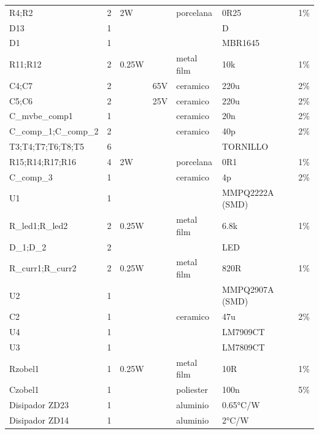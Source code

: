 \documentclass[a4paper,12pt,twoside]{article}
\begin{document}
\begin{table}[h!]
\begin{tabular}{@{}lllllll@{}}
R4;R2                 & 2        &  2W       &           &  porcelana & 0R25     & 1\% \\
D13                   & 1        &           &           &            & D        &     \\
D1                    & 1        &           &           &            & MBR1645  &     \\
R11;R12               & 2        &  0.25W    &           &  metal film& 10k      & 1\% \\
C4;C7                 & 2        &           & 65V       &  ceramico  & 220u     & 2\% \\
C5;C6                 & 2        &           & 25V       &  ceramico  & 220u     & 2\% \\
C\_mvbe\_comp1        & 1        &           &           &  ceramico  & 20n      & 2\% \\
C\_comp\_1;C\_comp\_2 & 2        &           &           &  ceramico  & 40p      & 2\% \\
T3;T4;T7;T6;T8;T5     & 6        &           &           &            & TORNILLO &     \\
R15;R14;R17;R16       & 4        &  2W       &           &  porcelana & 0R1      & 1\% \\
C\_comp\_3            & 1        &           &           &  ceramico  & 4p       & 2\% \\
U1                    & 1        &           &           &            & MMPQ2222A (SMD)& \\
R\_led1;R\_led2       & 2        &  0.25W    &           &  metal film& 6.8k     & 1\% \\
D\_1;D\_2             & 2        &           &           &            & LED      &     \\
R\_curr1;R\_curr2     & 2        &  0.25W    &           &  metal film& 820R     & 1\% \\
U2                    & 1        &           &           &            & MMPQ2907A (SMD) & \\
C2                    & 1        &           &           &  ceramico  & 47u      & 2\% \\
U4                    & 1        &           &           &            & LM7909CT &     \\
U3                    & 1        &           &           &            & LM7809CT &     \\
Rzobel1               & 1        &  0.25W    &           &  metal film& 10R      & 1\% \\
Czobel1               & 1        &           &           &  poliester & 100n     & 5\% \\ 
Disipador ZD23        & 1        &           &           &  aluminio  & 0.65°C/W &     \\  
Disipador ZD14        & 1        &           &           &  aluminio  & 2°C/W    &     \\ \bottomrule
\end{tabular}

\end{table}
\end{document}
